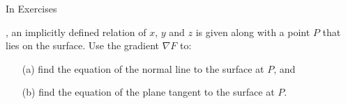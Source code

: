 {\noindent In Exercises}
{, an implicitly defined relation of $x$, $y$ and $z$ is given along with a point $P$ that lies on the surface. Use the gradient $\nabla F$ to:
\begin{enumerate}
	\item [(a)] find the equation of the normal line to the surface at $P$, and
	\item	[(b)] find the equation of the plane tangent  to the surface at $P$.
\end{enumerate}
}
